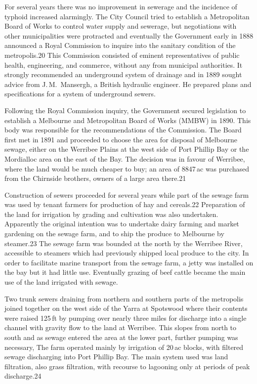 For several years there was no improvement in sewerage and the
incidence of typhoid increased alarmingly.  The City Council tried to
establish a Metropolitan Board of Works to control water supply and
sewerage, but negotiations with other municipalities were protracted
and eventually the Government early in 1888 announced a Royal
Commission to inquire into the sanitary condition of the metropolis.20
This Commission consisted of eminent representatives of public health,
engineering, and commerce, without any from municipal authorities.  It
strongly recommended an underground system of drainage and in 1889
sought advice from J.\,M.~Mansergh, a British hydraulic engineer.  He
prepared plans and specifications for a system of underground sewers.

Following the Royal Commission inquiry, the Government secured
legislation to establish a Melbourne and Metropolitan Board of Works
(MMBW) in 1890.  This body was responsible for the recommendations of
the Commission.  The Board first met in 1891 and proceeded to choose
the area for disposal of Melbourne sewage, either on the Werribee
Plains at the west side of Port Phillip Bay or the Mordialloc area on
the east of the Bay.  The decision was in favour of Werribee, where
the land would be much cheaper to buy; an area of 8847\,ac was
purchased from the Chirnside brothers, owners of a large area there.21

Construction of sewers proceeded for several years while part of the
sewage farm was used by tenant farmers for production of hay and
cereals.22 Preparation of the land for irrigation by grading and
cultivation was also undertaken.  Apparently the original intention
was to undertake dairy farming and market gardening on the sewage
farm, and to ship the produce to Melbourne by steamer.23 The sewage
farm was bounded at the north by the Werribee River, accessible to
steamers which had previously shipped local produce to the city.  In
order to facilitate marine transport from the sewage farm, a jetty was
installed on the bay but it had little use.  Eventually grazing of
beef cattle became the main use of the land irrigated with sewage.

Two trunk sewers draining from northern and southern parts of the
metropolis joined together on the west side of the Yarra at Spotswood
where their contents were raised 125\,ft by pumping over nearly three
miles for discharge into a single channel with gravity flow to the
land at Werribee.  This slopes from north to south and as sewage
entered the area at the lower part, further pumping was necessary, The
farm operated mainly by irrigation of 20\,ac blocks, with filtered
sewage discharging into Port Phillip Bay.  The main system used was
land filtration, also grass filtration, with recourse to lagooning
only at periods of peak discharge.24

